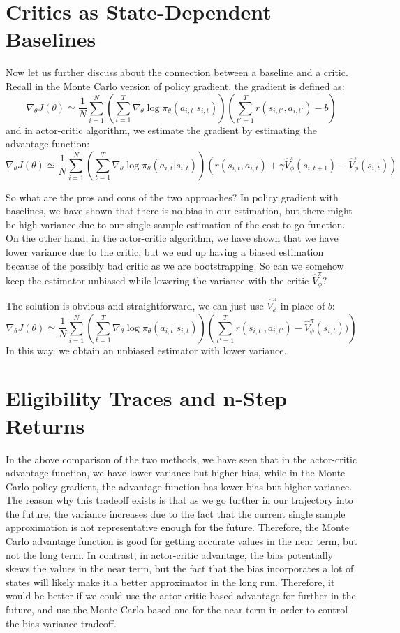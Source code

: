 \section{Critics as State-Dependent Baselines}
Now let us further discuss about the connection between a baseline and a critic. Recall in the Monte Carlo version of policy gradient, the gradient is defined as:
$$\nabla_\theta J(\theta) \simeq \frac{1}{N}\sum_{i=1}^N\left(\sum_{t=1}^T\nabla_\theta \log\pi_\theta(a_{i,t}|s_{i,t})\right)\left(\sum_{t'=1}^T r(s_{i,t'},a_{i,t'}) - b\right)$$
and in actor-critic algorithm, we estimate the gradient by estimating the advantage function:
$$\nabla_\theta J(\theta) \simeq \frac{1}{N}\sum_{i=1}^N\left(\sum_{t=1}^T\nabla_\theta \log\pi_\theta(a_{i,t}|s_{i,t})\right)\left(r(s_{i,t},a_{i,t}) + \gamma\hat{V}_\phi^\pi(s_{i,t+1})-\hat{V}_\phi^\pi(s_{i,t})\right)$$

So what are the pros and cons of the two approaches? In policy gradient with baselines, we have shown that there is no bias in our estimation, but there might be high variance due to our single-sample estimation of the cost-to-go function. On the other hand, in the actor-critic algorithm, we have shown that we have lower variance due to the critic, but we end up having a biased estimation because of the possibly bad critic as we are bootstrapping. So can we somehow keep the estimator unbiased while lowering the variance with the critic $\hat{V}^\pi_\phi$?

The solution is obvious and straightforward, we can just use $\hat{V}^\pi_\phi$ in place of $b$:
$$\nabla_\theta J(\theta) \simeq \frac{1}{N}\sum_{i=1}^N\left(\sum_{t=1}^T\nabla_\theta \log\pi_\theta(a_{i,t}|s_{i,t})\right)\left(\sum_{t'=1}^T r(s_{i,t'},a_{i,t'}) - \hat{V}^\pi_\phi(s_{i,t}))\right)$$
In this way, we obtain an unbiased estimator with lower variance. 

\section{Eligibility Traces and n-Step Returns}
In the above comparison of the two methods, we have seen that in the actor-critic advantage function, we have lower variance but higher bias, while in the Monte Carlo policy gradient, the advantage function has lower bias but higher variance. The reason why this tradeoff exists is that as we go further in our trajectory into the future, the variance increases due to the fact that the current single sample approximation is not representative enough for the future. Therefore, the Monte Carlo advantage function is good for getting accurate values in the near term, but not the long term. In contrast, in actor-critic advantage, the bias potentially skews the values in the near term, but the fact that the bias incorporates a lot of states will likely make it a better approximator in the long run. Therefore, it would be better if we could use the actor-critic based advantage for further in the future, and use the Monte Carlo based one for the near term in order to control the bias-variance tradeoff.

